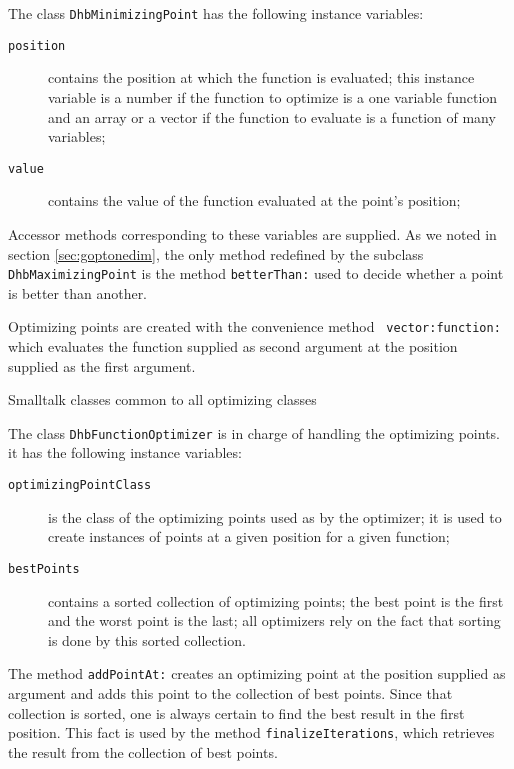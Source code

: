\documentclass[twoside]{book}
\begin{document}
\noindent The class {\tt DhbMinimizingPoint} has the following
instance variables:
\begin{description}
  \item[\tt position] contains the position at which the function
  is evaluated; this instance variable is a number if the function
  to optimize is a one variable function and an array or a vector
  if the function to evaluate is a function of many variables;
  \item[\tt value] contains the value of the function evaluated at the point's position;
\end{description}
Accessor methods corresponding to these variables are supplied. As
we noted in section \ref{sec:goptonedim}, the only method
redefined by the subclass {\tt DhbMaximizingPoint} is the method
{\tt betterThan:} used to decide whether a point is better than
another.

Optimizing points are created with the convenience method {\tt
vector:function:} which evaluates the function supplied as second
argument at the position supplied as the first argument.
\begin{listing} Smalltalk classes common to all optimizing classes \label{ls:optimizerCommon}


\end{listing}

The class {\tt DhbFunctionOptimizer} is in charge of handling the
optimizing points. it has the following instance variables:
\begin{description}
  \item[\tt optimizingPointClass] is the class of the optimizing
  points used as  by the optimizer; it is used
  to create instances of points at a given position for a given
  function;
  \item[\tt bestPoints] contains a sorted collection of optimizing
  points; the best point is the first and the worst point is the
  last; all optimizers rely on the fact that sorting is done by this sorted collection.
\end{description}
The method {\tt addPointAt:} creates an optimizing point at the
position supplied as argument and adds this point to the
collection of best points. Since that collection is sorted, one is
always certain to find the best result in the first position. This
fact is used by the method {\tt finalizeIterations}, which
retrieves the result from the collection of best points.
\end{document}
